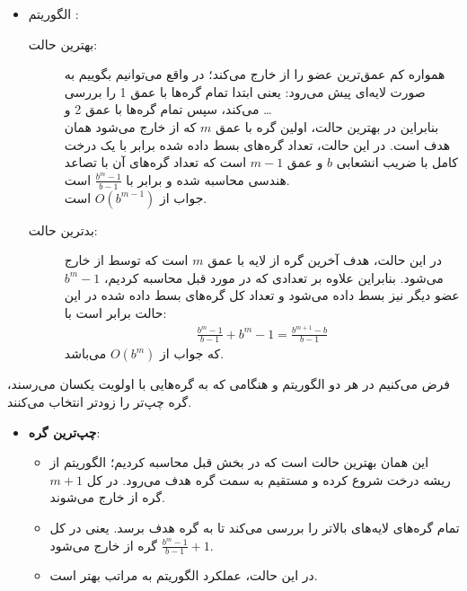 \begin{ابجد}
\begin{itemize}
    \item الگوریتم :
          \begin{description}
              \item[بهترین حالت:]  همواره کم عمق‌ترین عضو را از  خارج می‌کند؛ در واقع می‌توانیم بگوییم  به صورت لایه‌ای پیش می‌رود: یعنی ابتدا تمام گره‌ها با عمق 1 را بررسی می‌کند، سپس تمام گره‌ها با عمق 2 و \dots \\
                  بنابراین در بهترین حالت، اولین گره با عمق $m$ که از  خارج می‌شود همان هدف است. در این حالت، تعداد گره‌های بسط داده شده برابر با یک درخت کامل با ضریب انشعابی $b$ و عمق $m-1$ است که تعداد گره‌های آن با تصاعد هندسی محاسبه شده و برابر با $\frac{b^m - 1}{b - 1}$ است. \\
                  جواب از $O(b^{m-1})$ است.
              \item[بدترین حالت:] در این حالت، هدف آخرین گره از لایه با عمق $m$ است که توسط  از  خارج می‌شود. بنابراین علاوه بر تعدادی که در مورد قبل محاسبه کردیم، $b^m - 1$ عضو دیگر نیز بسط داده می‌شود و تعداد کل گره‌های بسط داده شده در این حالت برابر است با:
                  \begin{align*}
                      \frac{b^m - 1}{b - 1} + b^m - 1 = \frac{b^{m+1} - b}{b - 1}
                  \end{align*}
                  که جواب از $O(b^m)$ می‌باشد.
          \end{description}
\end{itemize}

\item فرض می‌کنیم در هر دو الگوریتم  و  هنگامی که به گره‌هایی با اولویت یکسان می‌رسند، گره چپ‌تر را زودتر انتخاب می‌کنند.
\begin{itemize}
    \item \textbf{چپ‌ترین گره}:
          \begin{itemize}
              \item[] این همان بهترین حالت  است که در بخش قبل محاسبه کردیم؛ الگوریتم از ریشه درخت شروع کرده و مستقیم به سمت گره هدف می‌رود. در کل $m+1$ گره از  خارج می‌شوند.
              \item[]  تمام گره‌های لایه‌های بالاتر را بررسی می‌کند تا به گره هدف برسد. یعنی در کل $\frac{b^m - 1}{b - 1} + 1$ گره از  خارج می‌شود.
              \item[] در این حالت، عملکرد الگوریتم  به مراتب بهتر است.
          \end{itemize}


\end{itemize}
\end{ابجد}
